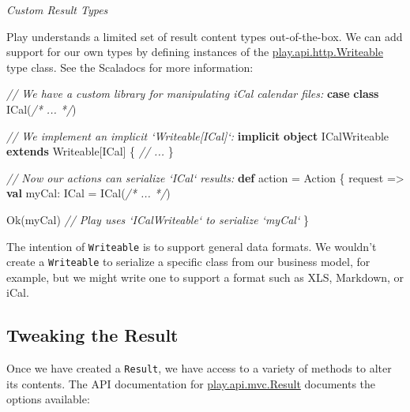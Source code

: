 \documentclass[oneside,11pt,a4paper,]{book}
\newenvironment{Shaded}{\begin{snugshade}}{\end{snugshade}}
\newcommand{\KeywordTok}[1]{\textcolor[rgb]{0.13,0.29,0.53}{\textbf{{#1}}}}
\newcommand{\CommentTok}[1]{\textcolor[rgb]{0.56,0.35,0.01}{\textit{{#1}}}}
\newcommand{\FunctionTok}[1]{\textcolor[rgb]{0.00,0.00,0.00}{{#1}}}
\newcommand{\NormalTok}[1]{{#1}}
\begin{document}
\begin{WarningCallout}

\emph{Custom Result Types}

Play understands a limited set of result content types out-of-the-box.
We can add support for our own types by defining instances of the
\href{https://www.playframework.com/documentation/2.3.x/api/scala/index.html\#play.api.http.Writeable}{play.api.http.Writeable}
type class. See the Scaladocs for more information:

\begin{Shaded}
\begin{Highlighting}[]
\CommentTok{// We have a custom library for manipulating iCal calendar files:}
\KeywordTok{case} \KeywordTok{class} \FunctionTok{ICal}\NormalTok{(}\CommentTok{/* ... */}\NormalTok{)}

\CommentTok{// We implement an implicit `Writeable[ICal]`:}
\KeywordTok{implicit} \KeywordTok{object} \NormalTok{ICalWriteable }\KeywordTok{extends} \NormalTok{Writeable[ICal] \{}
  \CommentTok{// ...}
\NormalTok{\}}

\CommentTok{// Now our actions can serialize `ICal` results:}
\KeywordTok{def} \NormalTok{action = Action \{ request =>}
  \KeywordTok{val} \NormalTok{myCal: ICal = }\FunctionTok{ICal}\NormalTok{(}\CommentTok{/* ... */}\NormalTok{)}

  \FunctionTok{Ok}\NormalTok{(myCal) }\CommentTok{// Play uses `ICalWriteable` to serialize `myCal`}
\NormalTok{\}}
\end{Highlighting}
\end{Shaded}

The intention of \texttt{Writeable} is to support general data formats.
We wouldn't create a \texttt{Writeable} to serialize a specific class
from our business model, for example, but we might write one to support
a format such as XLS, Markdown, or iCal.

\end{WarningCallout}

\subsection{Tweaking the Result}\label{tweaking-the-result}

Once we have created a \texttt{Result}, we have access to a variety of
methods to alter its contents. The API documentation for
\href{https://www.playframework.com/documentation/2.3.x/api/scala/index.html\#play.api.mvc.Result}{play.api.mvc.Result}
documents the options available:
\end{document}
